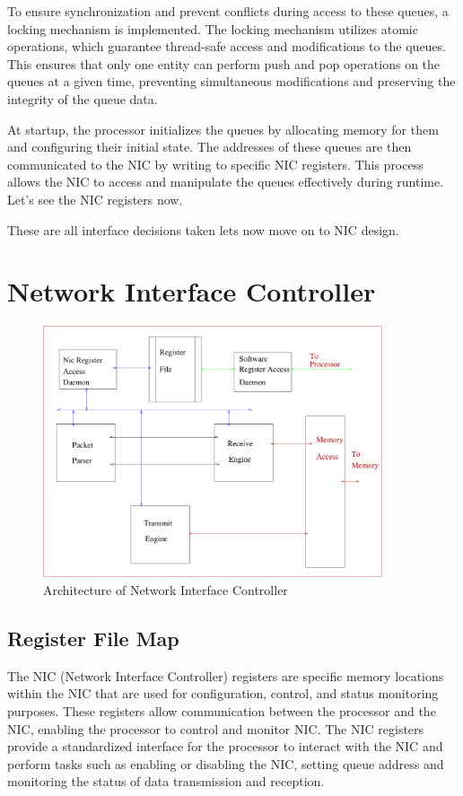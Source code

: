\documentclass[a4paper,11pt, final]{report}
\begin{document}
To ensure synchronization and prevent conflicts during access to these queues, a locking mechanism is implemented. The locking mechanism utilizes atomic operations, which guarantee thread-safe access and modifications to the queues. This ensures that only one entity can perform push and pop operations on the queues at a given time, preventing simultaneous modifications and preserving the integrity of the queue data.


At startup, the processor initializes the queues by allocating memory for them and configuring their initial state. The addresses of these queues are then communicated to the NIC by writing to specific NIC registers. This process allows the NIC to access and manipulate the queues effectively during runtime. Let's see the NIC registers now.


		These are all interface decisions taken lets now move on to NIC design.
	\section{Network Interface Controller}
		

		\begin{figure}[h]
			\centering
			\includegraphics[width=10cm]{./figures/NIC_Internal.pdf}
			\caption{Architecture of Network Interface Controller}
			\label{fig:NIC-Arch}
		\end{figure}

		\subsection{Register File Map}
				The NIC (Network Interface Controller) registers are specific memory locations within the NIC that are used for configuration, control, and status monitoring purposes. These registers allow communication between the processor and the NIC, enabling the processor to control and monitor NIC. The NIC registers provide a standardized interface for the processor to interact with the NIC and perform tasks such as enabling or disabling the NIC, setting queue address and monitoring the status of data transmission and reception.
\end{document}
